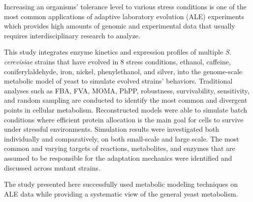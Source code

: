 Increasing an organisms’ tolerance level to various stress conditions is one of the most common applications of adaptive laboratory evolution (ALE) experiments which provides high amounts of genomic and experimental data that usually requires interdisciplinary research to analyze.

This study integrates enzyme kinetics and expression profiles of multiple \emph{S. cerevisiae} strains that have evolved in 8 stress conditions, ethanol, caffeine, coniferylaldehyde, iron, nickel, phenylethanol, and silver, into the genome-scale metabolic model of yeast to simulate evolved strains’ behaviors. Traditional analyses such as FBA, FVA, MOMA, PhPP, robustness, survivability, sensitivity, and random sampling are conducted to identify the most common and divergent points in cellular metabolism. Reconstructed models were able to simulate batch conditions where efficient protein allocation is the main goal for cells to survive under stressful environments. Simulation results were investigated both individually and comparatively, on both small-scale and large scale. The most common and varying targets of reactions, metabolites, and enzymes that are assumed to be responsible for the adaptation mechanics were identified and discussed across mutant strains.

The study presented here successfully used metabolic modeling techniques on ALE data while providing a systematic view of the general yeast metabolism.
